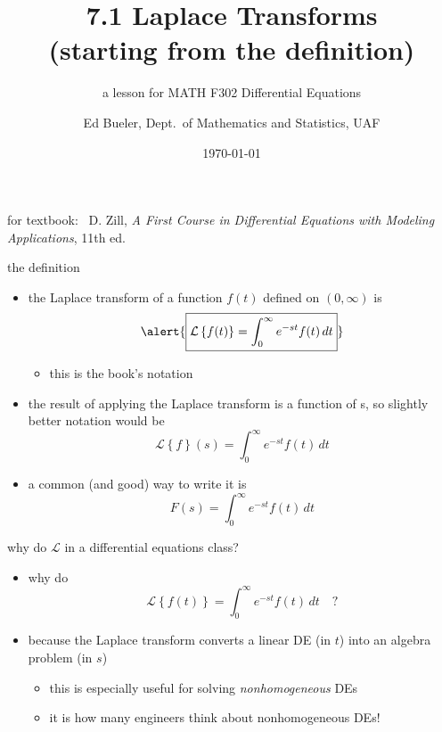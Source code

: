 \documentclass[urlcolor=blue,dvipsnames]{beamer}
\title{7.1 Laplace Transforms \\ (starting from the definition)}
\subtitle{a lesson for MATH F302 Differential Equations}
\author{Ed Bueler, Dept.~of Mathematics and Statistics, UAF}
\date{\tiny \today}
\begin{document}
\renewcommand{\thefootnote}{{\color{green} \arabic{footnote}}}

\begin{frame}
\titlepage

\centerline{\tiny for textbook: \, D. Zill, \emph{A First Course in Differential Equations with Modeling Applications}, 11th ed.}
\end{frame}

\newcommand{\LL}[1]{\mathcal{L}\left\{#1\right\}}

\begin{frame}{the definition}

\begin{itemize}
\item the \alert{Laplace transform} of a function $f(t)$ defined on $(0,\infty)$ is
    $$\alert{\boxed{\LL{f(t)} = \int_0^\infty e^{-st} f(t)\,dt}}$$

\vspace{-2mm}
    \begin{itemize}
    \item this is the book's notation
    \end{itemize}
\item the \alert{result} of applying the Laplace transform \alert{is a function of s}, so slightly better notation would be
    $$\LL{f}(s) = \int_0^\infty e^{-st} f(t)\,dt$$
\item a common (and good) way to write it is
    $$F(s) = \int_0^\infty e^{-st} f(t)\,dt$$
\end{itemize}
\end{frame}


\begin{frame}{why do $\mathcal{L}$ in a differential equations class?}

\begin{itemize}
\item why do
    $$\LL{f(t)} = \int_0^\infty e^{-st} f(t)\,dt \quad?$$
\item because the Laplace transform \alert{converts a linear DE} (in $t$) \alert{into an algebra problem} (in $s$)
    \begin{itemize}
    \item this is especially useful for solving \emph{nonhomogeneous} DEs
    \item it is how many engineers think about nonhomogeneous DEs!
    \end{itemize}
\end{itemize}
\end{frame}
\end{document}
